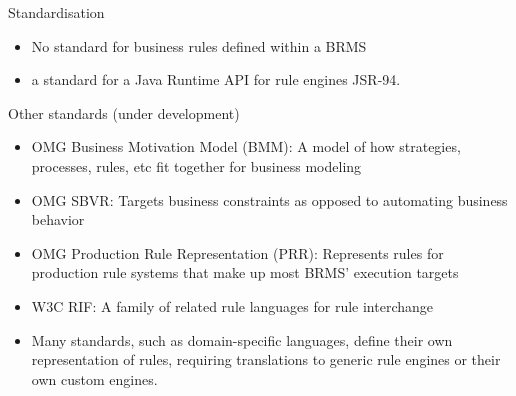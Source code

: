 {\begin{frame}
  \begin{block}{Standardisation}
    \begin{itemize}
      \item No standard for business rules defined within a BRMS
      \item a standard for a Java Runtime API for rule engines JSR-94.
    \end{itemize}
  \end{block}

  \begin{block}{Other standards (under development)}
    \begin{itemize}
      \item OMG Business Motivation Model (BMM): A model of how strategies, processes, rules, etc fit together for business modeling
      \item OMG SBVR: Targets business constraints as opposed to automating business behavior
      \item OMG Production Rule Representation (PRR): Represents rules for production rule systems that make up most BRMS' execution targets
      \item W3C RIF: A family of related rule languages for rule interchange
      \item Many standards, such as domain-specific languages, define their own representation of rules, requiring translations to generic rule engines or their own custom engines.
    \end{itemize}
  \end{block}
\end{frame}
}
